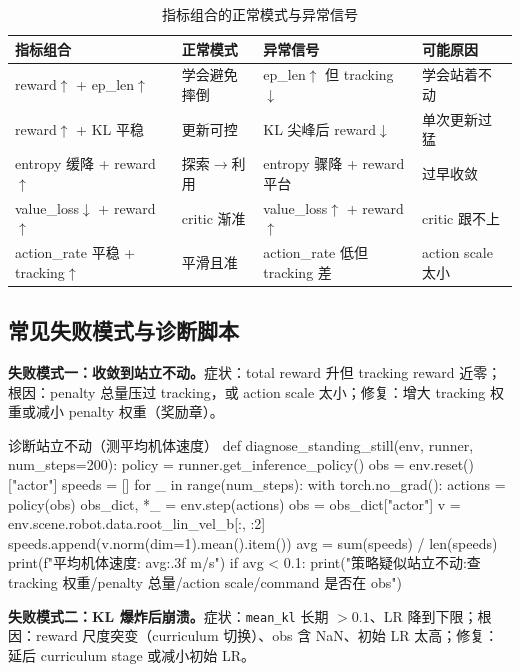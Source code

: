 \begin{table}[H]
\centering
\caption{指标组合的正常模式与异常信号}
\label{tab:rlmc-joint-read}
\begin{tabular}{p{3.4cm}p{2.8cm}p{2.8cm}p{2.4cm}}
\hline
指标组合 & 正常模式 & 异常信号 & 可能原因 \\
\hline
reward$\uparrow$ + ep\_len$\uparrow$ & 学会避免摔倒 & ep\_len$\uparrow$ 但 tracking$\downarrow$ & 学会站着不动 \\
reward$\uparrow$ + KL 平稳 & 更新可控 & KL 尖峰后 reward$\downarrow$ & 单次更新过猛 \\
entropy 缓降 + reward$\uparrow$ & 探索$\to$利用 & entropy 骤降 + reward 平台 & 过早收敛 \\
value\_loss$\downarrow$ + reward$\uparrow$ & critic 渐准 & value\_loss$\uparrow$ + reward$\uparrow$ & critic 跟不上 \\
action\_rate 平稳 + tracking$\uparrow$ & 平滑且准 & action\_rate 低但 tracking 差 & action scale 太小 \\
\hline
\end{tabular}
\end{table}

\subsection{常见失败模式与诊断脚本}

\textbf{失败模式一：收敛到站立不动。}症状：total reward 升但 tracking reward 近零；根因：penalty 总量压过 tracking，或 action scale 太小；修复：增大 tracking 权重或减小 penalty 权重（奖励章）。

\begin{codebox}[Python]{诊断站立不动（测平均机体速度）}
def diagnose_standing_still(env, runner, num_steps=200):
    policy = runner.get_inference_policy()
    obs = env.reset()["actor"]
    speeds = []
    for _ in range(num_steps):
        with torch.no_grad():
            actions = policy(obs)
        obs_dict, *_ = env.step(actions)
        obs = obs_dict["actor"]
        v = env.scene.robot.data.root_lin_vel_b[:, :2]
        speeds.append(v.norm(dim=1).mean().item())
    avg = sum(speeds) / len(speeds)
    print(f"平均机体速度: {avg:.3f} m/s")
    if avg < 0.1:
        print("策略疑似站立不动:查 tracking 权重/penalty 总量/action scale/command 是否在 obs")
\end{codebox}

\textbf{失败模式二：KL 爆炸后崩溃。}症状：\verb|mean_kl| 长期 $>0.1$、LR 降到下限；根因：reward 尺度突变（curriculum 切换）、obs 含 NaN、初始 LR 太高；修复：延后 curriculum stage 或减小初始 LR。

